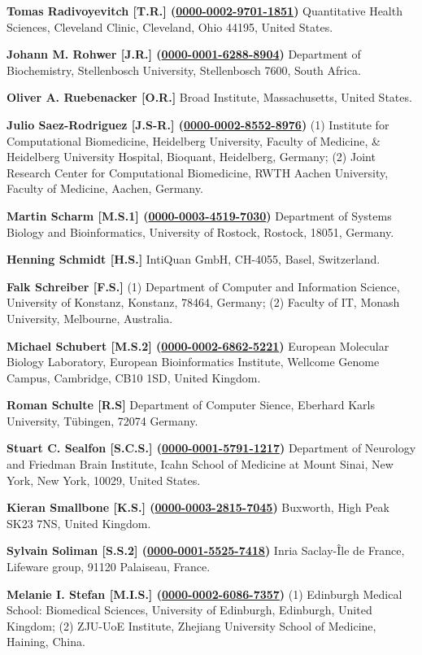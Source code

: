 \documentclass{sbml-paper}
\newcommand{\orcid}[1]{\href{https://orcid.org/#1}{#1}}
\begin{document}
\textbf{Tomas Radivoyevitch [T.R.] (\orcid{0000-0002-9701-1851})} Quantitative Health Sciences, Cleveland Clinic, Cleveland, Ohio 44195, United States.

\textbf{Johann M. Rohwer [J.R.] (\orcid{0000-0001-6288-8904})} Department of Biochemistry, Stellenbosch University, Stellenbosch 7600, South Africa.

\textbf{Oliver A. Ruebenacker [O.R.]} Broad Institute, Massachusetts, United States.

\textbf{Julio Saez-Rodriguez [J.S-R.] (\orcid{0000-0002-8552-8976})} (1) Institute for Computational Biomedicine, Heidelberg University, Faculty of Medicine, \& Heidelberg University Hospital, Bioquant, Heidelberg, Germany; (2) Joint Research Center for Computational Biomedicine, RWTH Aachen University, Faculty of Medicine, Aachen, Germany.

\textbf{Martin Scharm [M.S.1] (\orcid{0000-0003-4519-7030})} Department of Systems Biology and Bioinformatics, University of Rostock, Rostock, 18051, Germany.

\textbf{Henning Schmidt [H.S.]} IntiQuan GmbH, CH-4055, Basel, Switzerland.

\textbf{Falk Schreiber [F.S.]} (1) Department of Computer and Information Science, University of Konstanz, Konstanz, 78464, Germany; (2) Faculty of IT, Monash University, Melbourne, Australia.

\textbf{Michael Schubert [M.S.2] (\orcid{0000-0002-6862-5221})} European Molecular Biology Laboratory, European Bioinformatics Institute, Wellcome Genome Campus, Cambridge, CB10 1SD, United Kingdom.

\textbf{Roman Schulte [R.S]} Department of Computer Sience, Eberhard Karls University, T\"{u}bingen, 72074 Germany.

\textbf{Stuart C. Sealfon [S.C.S.] (\orcid{0000-0001-5791-1217})} Department of Neurology and Friedman Brain Institute, Icahn School of Medicine at Mount Sinai, New York, New York, 10029, United States.

\textbf{Kieran Smallbone [K.S.] (\orcid{0000-0003-2815-7045})} Buxworth, High Peak SK23 7NS, United Kingdom.

\textbf{Sylvain Soliman [S.S.2] (\orcid{0000-0001-5525-7418})} Inria Saclay-Île de France, Lifeware group, 91120 Palaiseau, France.

\textbf{Melanie I. Stefan [M.I.S.] (\orcid{0000-0002-6086-7357})} (1) Edinburgh Medical School: Biomedical Sciences, University of Edinburgh, Edinburgh, United Kingdom; (2) ZJU-UoE Institute, Zhejiang University School of Medicine, Haining, China.
\end{document}
